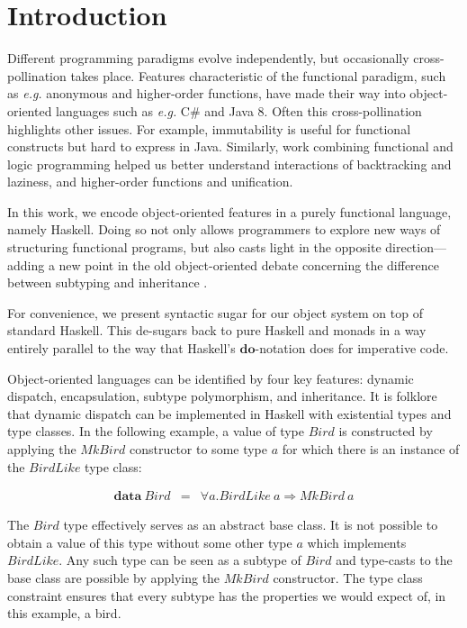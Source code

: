 \documentclass[runningheads,a4paper]{llncs}
\begin{document}
\section{Introduction}
\label{sec:introduction}

Different programming paradigms evolve independently, but occasionally cross-pollination takes place. Features characteristic of the functional paradigm, such as \emph{e.g.} anonymous and higher-order functions, have made their way into object-oriented languages such as \emph{e.g.} C\# and Java 8. Often this cross-pollination highlights other issues. For example, immutability is useful for functional constructs but hard to express in Java. Similarly, work combining functional and logic programming \cite{nadathur1988overview,hanus2006curry,Somogyi1996mercury} helped us better understand interactions of backtracking and laziness, and higher-order functions and unification.

In this work, we encode object-oriented features in a purely functional language, namely Haskell. Doing so not only allows programmers to explore new ways of structuring functional programs, but also casts light in the opposite direction---adding a new point in the old object-oriented debate concerning the difference between subtyping and inheritance \cite{cook1990inheritance}.

For convenience, we present syntactic sugar for our object system on top of standard Haskell. This de-sugars back to pure Haskell and monads in a way entirely
parallel to the way that Haskell's $\mathbf{do}$-notation does for imperative code.

Object-oriented languages can be identified by four key features: dynamic dispatch, encapsulation, subtype polymorphism, and inheritance. It is folklore that dynamic dispatch can be implemented in Haskell with existential types and type classes. In the following example, a value of type $\mathit{Bird}$ is constructed by applying the $\mathit{MkBird}$ constructor to some type $a$ for which there is an instance of the $\mathit{BirdLike}$ type class:

\begin{displaymath}
\begin{array}{lcl}
\mathbf{data}~\mathit{Bird} & = & \forall a. \mathit{BirdLike}~a \Rightarrow \mathit{MkBird}~a
\end{array}
\end{displaymath}

The $\mathit{Bird}$ type effectively serves as an abstract base class. It is not possible to obtain a value of this type without some other type $a$ which implements $\mathit{BirdLike}$. Any such type can be seen as a subtype of $\mathit{Bird}$ and type-casts to the base class are possible by applying the $\mathit{MkBird}$ constructor. The type class constraint ensures that every subtype has the properties we would expect of, in this example, a bird.
\end{document}
